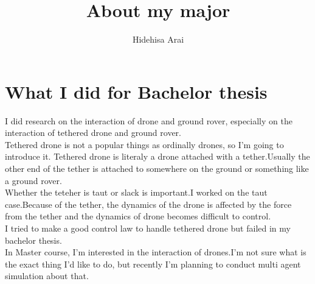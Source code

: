 \documentclass[a4paper,10pt]{article}
\title{About my major}
\author{Hidehisa Arai}
\begin{document}
\maketitle


\section{What I did for Bachelor thesis}
I did research on the interaction of drone and ground rover, especially on the interaction of tethered drone and ground rover.\\

Tethered drone is not a popular things as ordinally drones, so I'm going to introduce it.
Tethered drone is literaly a drone attached with a tether.Usually the other end of the tether is attached to somewhere on the ground or
something like a ground rover. \\

Whether the teteher is taut or slack is important.I worked on the taut case.Because of the tether, the dynamics of the drone is affected by the 
force from the tether and the dynamics of drone becomes difficult to control.\\

I tried to make a good control law to handle tethered drone but failed in my bachelor thesis.\\

In Master course, I'm interested in the interaction of drones.I'm not sure what is the exact thing I'd like to do, but recently I'm planning to 
conduct multi agent simulation about that.
\end{document}
